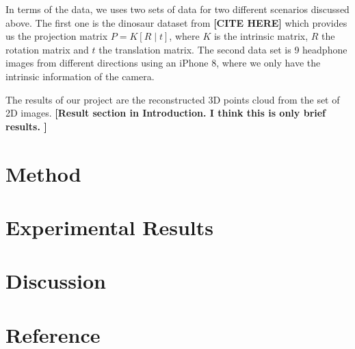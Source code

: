 \documentclass[10pt]{article}
\begin{document}
In terms of the data, we uses two sets of data for two different scenarios discussed above. The first one is the dinosaur dataset from \textbf{[CITE HERE]} which provides us the projection matrix $P = K [R\mid t]$, where $K$ is the intrinsic matrix, $R$ the rotation matrix and $t$ the translation matrix. The second data set is 9 headphone images from different directions using an iPhone 8, where we only have the intrinsic information of the camera. 

The results of our project are the reconstructed 3D points cloud from the set of 2D images. \textbf{[Result section in Introduction. I think this is only brief results. ]}


\section*{Method}


\section*{Experimental Results}
\section*{Discussion}
\section*{Reference}
\end{document}
